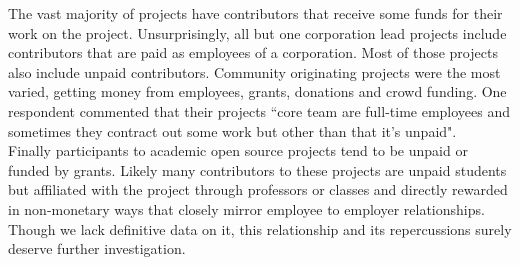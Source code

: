 \noindent The vast majority of projects have contributors that receive some funds for their work on the project. Unsurprisingly, all but one corporation lead projects include contributors that are paid as employees of a corporation. Most of those projects also include unpaid contributors. Community originating projects were the most varied, getting money from employees, grants, donations and crowd funding. One respondent commented that their projects ``core team are full-time employees and sometimes they contract out some work but other than that it's unpaid".\\

\noindent Finally participants to academic open source projects tend to be unpaid or funded by grants. Likely many contributors to these projects are unpaid students but affiliated with the project through professors or classes and directly rewarded in non-monetary ways that closely mirror employee to employer relationships. Though we lack definitive data on it, this relationship and its repercussions surely deserve further investigation.
